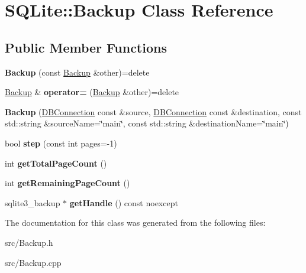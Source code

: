 \hypertarget{class_s_q_lite_1_1_backup}{\section{S\-Q\-Lite\-:\-:Backup Class Reference}
\label{class_s_q_lite_1_1_backup}
}
\subsection*{Public Member Functions}
\begin{DoxyCompactItemize}
\item 
\hypertarget{class_s_q_lite_1_1_backup_a85bff6db538293ba839003bab73335c3}{{\bfseries Backup} (const \hyperlink{class_s_q_lite_1_1_backup}{Backup} \&other)=delete}\label{class_s_q_lite_1_1_backup_a85bff6db538293ba839003bab73335c3}

\item 
\hypertarget{class_s_q_lite_1_1_backup_abf35a70084311262e4121e7f7fe06fe8}{\hyperlink{class_s_q_lite_1_1_backup}{Backup} \& {\bfseries operator=} (\hyperlink{class_s_q_lite_1_1_backup}{Backup} \&other)=delete}\label{class_s_q_lite_1_1_backup_abf35a70084311262e4121e7f7fe06fe8}

\item 
\hypertarget{class_s_q_lite_1_1_backup_af2b065a181ac9ed81273d1360c4787bd}{{\bfseries Backup} (\hyperlink{class_s_q_lite_1_1_d_b_connection}{D\-B\-Connection} const \&source, \hyperlink{class_s_q_lite_1_1_d_b_connection}{D\-B\-Connection} const \&destination, const std\-::string \&source\-Name=\char`\"{}main\char`\"{}, const std\-::string \&destination\-Name=\char`\"{}main\char`\"{})}\label{class_s_q_lite_1_1_backup_af2b065a181ac9ed81273d1360c4787bd}

\item 
\hypertarget{class_s_q_lite_1_1_backup_a6ec2f5a0d8db598c15311437c4b9aa43}{bool {\bfseries step} (const int pages=-\/1)}\label{class_s_q_lite_1_1_backup_a6ec2f5a0d8db598c15311437c4b9aa43}

\item 
\hypertarget{class_s_q_lite_1_1_backup_aa4065df5ee53f85250b0204a28b2b9a9}{int {\bfseries get\-Total\-Page\-Count} ()}\label{class_s_q_lite_1_1_backup_aa4065df5ee53f85250b0204a28b2b9a9}

\item 
\hypertarget{class_s_q_lite_1_1_backup_a60ec7f043380c27b89c8b574e6360294}{int {\bfseries get\-Remaining\-Page\-Count} ()}\label{class_s_q_lite_1_1_backup_a60ec7f043380c27b89c8b574e6360294}

\item 
\hypertarget{class_s_q_lite_1_1_backup_ad2378b89c6ff3354a6852fea18c3c9f9}{sqlite3\-\_\-backup $\ast$ {\bfseries get\-Handle} () const noexcept}\label{class_s_q_lite_1_1_backup_ad2378b89c6ff3354a6852fea18c3c9f9}

\end{DoxyCompactItemize}


The documentation for this class was generated from the following files\-:\begin{DoxyCompactItemize}
\item 
src/Backup.\-h\item 
src/Backup.\-cpp\end{DoxyCompactItemize}
